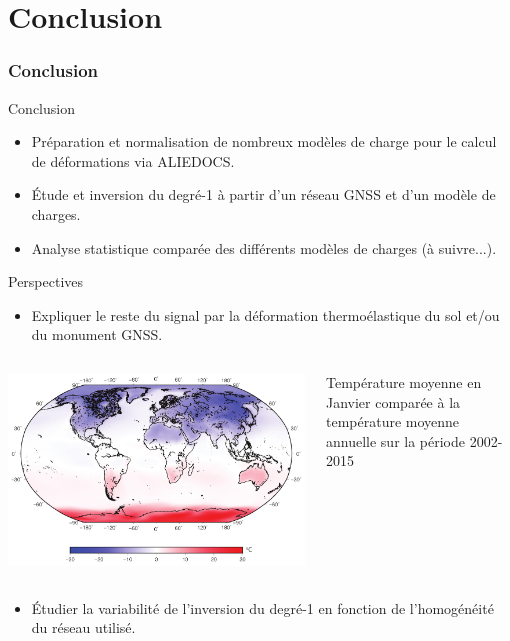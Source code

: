 \documentclass[9pt]{beamer}
\begin{document}
\section*{Conclusion}

\begin{frame}
\frametitle{Conclusion}
\begin{block}{Conclusion}
     \begin{itemize}
        \item Préparation et normalisation de nombreux modèles de charge pour le calcul de déformations via ALIEDOCS.
        \item Étude et inversion du degré-1 à partir d'un réseau GNSS et d'un modèle de charges.
        \item Analyse statistique comparée des différents modèles de charges (à suivre...).
\end{itemize}
     \end{block}

\begin{block}{Perspectives}
\begin{itemize}
    \item Expliquer le reste du signal par la déformation thermoélastique du sol et/ou du monument GNSS.
\end{itemize}
\begin{columns}
        \begin{column}{0.6\textwidth}
            \centering
            \includegraphics[height=0.26\textheight]{figures/temperature_field.png}
        \end{column}
        \begin{column}{0.4\textwidth}
            \small{Température moyenne en Janvier comparée à la température moyenne annuelle sur la période 2002-2015}
        \end{column}
\end{columns}
\begin{itemize}
    \item Étudier la variabilité de l'inversion du degré-1 en fonction de l'homogénéité du réseau utilisé.
\end{itemize}


\end{block}
\end{frame}
\end{document}
